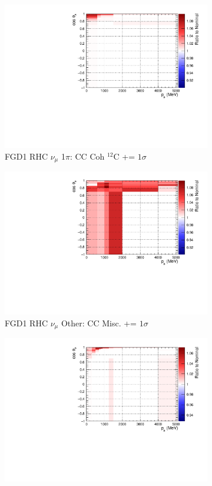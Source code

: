 \begin{figure}
\begin{subfigure}{.32\textwidth}
  \includegraphics[width=0.85\linewidth]{figs/sig/FGD1_NuMuBkg_CC1pi_in_AntiNu_Mode_CC_Coh_C_+1sig.pdf}
  \caption{FGD1 RHC $\nu_{\mu}$ 1$\pi$: CC Coh $^{12}$C += $1\sigma$}
  \label{fig:sigvar_FGD1_NuMuBkg_CC1pi_in_AntiNu_Mode}
\end{subfigure}
\begin{subfigure}{.32\textwidth}
  \centering
  \includegraphics[width=0.85\linewidth]{figs/sig/FGD1_NuMuBkg_CCOther_in_AntiNu_Mode_CC_Misc_+1sig.pdf}
  \caption{FGD1 RHC $\nu_{\mu}$ Other: CC Misc. += $1\sigma$}
  \label{fig:sigvar_FGD1_NuMuBkg_CCOther_in_AntiNu_Mode}
\end{subfigure}
\begin{subfigure}{.32\textwidth}
  \centering
  \includegraphics[width=0.85\linewidth]{figs/sig/FGD2_NuMuBkg_CC0pi_in_AntiNu_Mode_Q2_norm_0_+1sig.pdf}

\end{subfigure}
\end{figure}
